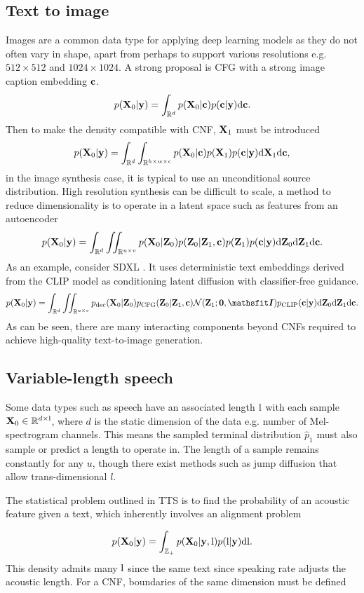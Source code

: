 \subsection{Text to image}
Images are a common data type for applying deep learning models as they do not often vary in shape, apart from perhaps to support various resolutions e.g. $512\times 512$ and $1024\times 1024$. A strong proposal is \ac{CFG} with a strong image caption embedding ${\mathbf{c}}$.
\[
p({\mathbf{X}}_0|{\mathbf{y}})=\int_{\mathbb{R}^d} p({\mathbf{X}}_0|{\mathbf{c}})p({\mathbf{c}}|{\mathbf{y}})\mathrm{d} {\mathbf{c}}.
\]
Then to make the density compatible with CNF, ${\mathbf{X}}_1$ must be introduced
\[
p({\mathbf{X}}_0|{\mathbf{y}})=\int_{\mathbb{R}^d}\int_{\mathbb{R}^{h\times w\times c}} p({\mathbf{X}}_0|{\mathbf{c}})p({\mathbf{X}}_1)p({\mathbf{c}}|{\mathbf{y}})\mathrm{d} {\mathbf{X}}_1\mathrm{d} {\mathbf{c}},
\]
in the image synthesis case, it is typical to use an unconditional source distribution. High resolution synthesis can be difficult to scale, a method to reduce dimensionality is to operate in a latent space such as features from an autoencoder
\[
p({\mathbf{X}}_0|{\mathbf{y}})=\int_{\mathbb{R}^d}\iint_{\mathbb{R}^{u\times v}} p({\mathbf{X}}_0|{\mathbf{Z}}_0)p({\mathbf{Z}}_0|{\mathbf{Z}}_1,{\mathbf{c}})p({\mathbf{Z}}_1)p({\mathbf{c}}|{\mathbf{y}})\mathrm{d} {\mathbf{Z}}_0\mathrm{d} {\mathbf{Z}}_1\mathrm{d} {\mathbf{c}}.
\]
As an example, consider SDXL \citep{podellSDXLImprovingLatent2023}. It uses deterministic text embeddings derived from the CLIP model as conditioning latent diffusion with classifier-free guidance.
\[
p(\rmX_0|\rvy)=\int_{\R^d}\iint_{\R^{u\times v}} p_\mathrm{dec}(\rmX_0|\rmZ_0)p_\mathrm{CFG}(\rmZ_0|\rmZ_1,\rvc)\gN(\rmZ_1;\bm 0, \tI)p_\mathrm{CLIP}(\rvc|\rvy)\dd \rmZ_0\dd \rmZ_1\dd \rvc.
\]
As can be seen, there are many interacting components beyond CNFs required to achieve high-quality text-to-image generation.

\subsection{Variable-length speech}
Some data types such as speech have an associated length ${\textnormal{l}}$ with each sample ${\mathbf{X}}_0\in\mathbb{R}^{d\times{\textnormal{l}}}$, where $d$ is the static dimension of the data e.g. number of Mel-spectrogram channels. This means the sampled terminal distribution $\hat p_1$ must also sample or predict a length to operate in. The length of a sample remains constantly for any $u$, though there exist methods such as jump diffusion that allow trans-dimensional $l$.

The statistical problem outlined in \ac{TTS} is to find the probability of an acoustic feature given a text, which inherently involves an alignment problem

\[
p({\mathbf{X}}_0|{\mathbf{y}})=\int_{{\mathbb{Z}}_+} p({\mathbf{X}}_0|{\mathbf{y}},{\textnormal{l}})p({\textnormal{l}}|{\mathbf{y}})\mathrm{d}{\textnormal{l}}.
\]
This density admits many ${\textnormal{l}}$ since the same text since speaking rate adjusts the acoustic length. For a \ac{CNF}, boundaries of the same dimension must be defined

